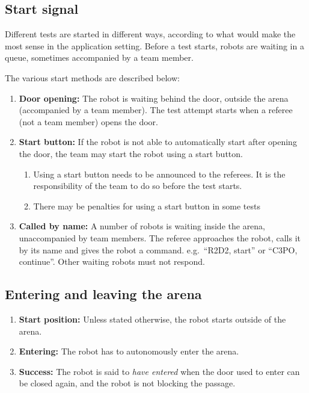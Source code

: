 \subsection{Start signal}
\label{rule:start_signal}

Different tests are started in different ways, according to what would make the most sense in the application setting.
Before a test starts, robots are waiting in a queue, sometimes accompanied by a team member.

The various start methods are described below:
\begin{enumerate}
	\item \textbf{Door opening:} The robot is waiting behind the door, outside the arena (accompanied by a team member). The test attempt starts when a referee (not a team member) opens the door.
	\item \textbf{Start button:} If the robot is not able to automatically start after opening the door, the team may start the robot using a start button.
	\begin{enumerate}
		\item Using a start button needs to be announced to the referees. It is the responsibility of the team to do so before the test starts.
		\item There may be penalties for using a start button in some tests
	\end{enumerate}
    \item \textbf{Called by name:} A number of robots is waiting inside the arena, unaccompanied by team members.
				      The referee approaches the robot, calls it by its name and gives the robot a command. e.g.~\enquote{R2D2, start} or \enquote{C3PO, continue}.
				      Other waiting robots must not respond.
\end{enumerate}


\subsection{Entering and leaving the arena}
\label{rule:start_position}
\begin{enumerate}
	\item \textbf{Start position:} Unless stated otherwise, the robot starts outside of the arena.
	\item \textbf{Entering:} The robot has to autonomously enter the arena.
	\item \textbf{Success:} The robot is said to \emph{have entered} when the door used to enter can be closed again, and the robot is not blocking the passage.
\end{enumerate}



